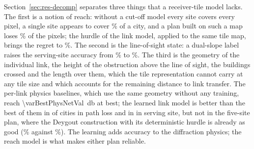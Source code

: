 Section~\ref{sec:res-decomp} separates three things that a receiver-tile
model lacks. The first is a notion of reach: without a cut-off model every
site covers every pixel, a single site appears to cover \covTarget\% of a
city, and a plan built on such a map loses \regretGbdt\% of the pixels;
the hurdle of the link model, applied to the same tile map, brings the
regret to \varGbdtHRegret\%. The second is the line-of-sight state: a
dual-slope label raises the serving-site accuracy from \varGbdtAssoc\% to
\varGbdtLosAssoc\%. The third is the geometry of the individual link, the
height of the obstruction above the line of sight, the buildings crossed
and the length over them, which the tile representation cannot carry at any
tile size and which accounts for the remaining distance to link transfer.
The per-link physics baselines, which use the same geometry without any
training, reach \SI{\varBestPhysNetVal}{\decibel} at best; the learned link
model is better than the best of them in \nLinkBetterPhysNet{} of
\nVarFolds{} cities in path loss and in \nLinkBetterPhysAssoc{} in serving
site, but not in the five-site plan, where the Deygout construction with
its deterministic hurdle is already as good (\varDeygoutRegret\% against
\regretLink\%). The learning adds accuracy to the diffraction physics; the
reach model is what makes either plan reliable.

